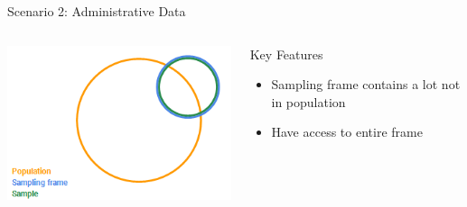 \documentclass[aspectratio=169]{../latex_main/tntbeamer}  %
\begin{document}
	
	\begin{frame}{Scenario 2: Administrative Data}
	    \begin{columns}
	        \begin{column}{.4\textwidth}

	               \includegraphics[scale=.8]{Bild4}
	               
	        \end{column}
	        
	        \begin{column}{.4\textwidth}
	            Key Features
                \begin{itemize}
                    \item Sampling frame contains a lot not in population
                    \item Have access to entire frame
                \end{itemize}
	        \end{column}
	        
	    \end{columns}
	    
	\end{frame}
	
\end{document}
